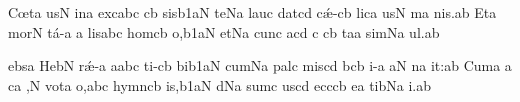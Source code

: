 \bigskip

\nosolesmescustos
\initiumgregorianum
{}%
\sgn C{\oe}t\punctum a\egn
\sgn {}us\punctum N\egn
\spatium
\sgn {}in\punctum a\egn
\spatium
\sgn {}e{xc}\punctum a\nonspatium\quilismapes bc\egn
{}\clivis cb\egn
\sgn sis\episem b1\clivis aN\egn
\spatium
\divisiominima
\spatium
\sgn te{}\pes Na\egn
\spatium
\sgn l{a}u\punctum c\egn
\sgn dat\pes cd\egn
\spatium
\sgn c{\'\ae}-\clivis cb\egn
\sgn lic\punctum a\egn
\sgn {}us\punctum N\egn
\spatium
{}m\punctum a\egn
\sgn ni{s.}\punctum a\augmentum b\egn
\spatium
\divisiomaior
\spatium
\sgn {}Et\punctum a\egn
\spatium
\sgn mor\punctum N\egn
\sgn t{\'a}-\punctum a\egn
\custos a
\lineaproxima
\sgn lis\punctum a\nonspatium\quilismapes bc\egn
\spatium
\sgn h{o}m\clivis cb\egn
\sgn {}o,\episem b1\clivis aN\egn
\spatium
\divisiominima
\spatium
\sgn {}et\pes Na\egn
\spatium
\sgn c{u}n\punctum c\egn
{}a{}\pes cd\egn
\spatium
{}\punctum c\egn
{}\clivis cb\egn
\sgn ta{}\punctum a\egn
\spatium
\sgn sim\pes Na\egn
\sgn {}u{l.}\punctum a\augmentum b\egn
\spatium
\Finisgregoriana

\bigskip

\nosolesmescustos
\initiumgregorianum
{}%
{}e{bs}\punctum a\egn
\spatium
\sgn Heb\punctum N\egn
\sgn r{\'\ae}-\punctum a\egn
\sgn {}a{}\punctum a\nonspatium\quilismapes bc\egn
\spatium
\sgn t{i}{-}\clivis cb\egn
\sgn bi{}\episem b1\clivis aN\egn
\spatium
\divisiominima
\spatium
\sgn cum\pes Na\egn
\spatium
\sgn p{a}l\punctum c\egn
\sgn m{i}s\pes cd\egn
\spatium
{}b\cephalicus cb\egn
{}i-\punctum a\egn
\sgn {}a{}\punctum N\egn
\spatium
{}n\punctum a\egn
\sgn {}i{t:}\punctum a\augmentum b\egn
\spatium
\divisiomaior
\spatium
\sgn Cum\punctum a\egn
\spatium
\custos a
\lineaproxima
{}c\punctum a\egn
{},\punctum N\egn
\spatium
\sgn v{o}t\punctum a\egn
\sgn {}o,\punctum a\nonspatium\quilismapes bc\egn
\spatium
\sgn h{y}{mn}\clivis cb\egn
\sgn {}i{s,}\episem b1\clivis aN\egn
\spatium
\divisiominima
\spatium
{}d\pes Na\egn
\sgn s{u}m\punctum c\egn
\sgn {}us\pes cd\egn
\spatium
\sgn {}e{cc}\clivis cb\egn
\sgn {}e{}\punctum a\egn
\spatium
\sgn t{i}b\pes Na\egn
\sgn {}i.\punctum a\augmentum b\egn
\spatium
\Finisgregoriana

